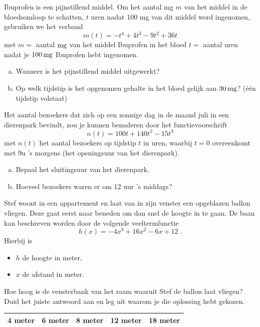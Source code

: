 \documentclass[12pt,twoside,a4paper]{article}
\begin{document}
\begin{oefening}
Ibuprofen is een pijnstillend middel.  Om het aantal mg $m$ van het middel in de bloedsomloop te schatten, $t$ uren nadat 100 mg van dit middel werd ingenomen, gebruiken we het verband
$$m(t)=-t^4+4t^3-9t^2+36t$$
met $m =$ aantal $\mg$ van het middel Ibuprofen in het bloed $t = $ aantal uren nadat je $100 \mg$ Ibuprofen hebt ingenomen.
\begin{enumerate}[(a)]
  \item Wanneer is het pijnstillend middel uitgewerkt?
  \item Op welk tijdstip is het opgenomen gehalte in het bloed gelijk aan $30 \mg$? (één tijdstip volstaat)
\end{enumerate}
\end{oefening}

\begin{oefening}
Het aantal bezoekers dat zich op een zonnige dag in de maand juli in een dierenpark bevindt, zou je kunnen benaderen door het functievoorschrift
$$n(t)=100t+140t^2-15t^3$$
met $n(t)$ het aantal bezoekers op tijdstip $t$ in uren, waarbij $t=0$ overeenkomt met 9u 's morgens (het openingsuur van het dierenpark).
\begin{enumerate}[(a)]
  \item Bepaal het sluitingsuur van het dierenpark.
  \item Hoeveel bezoekers waren er om 12 uur 's middags?
\end{enumerate}
\end{oefening}

\begin{oefening}
Stef woont in een appartement en laat van in zijn venster een opgeblazen ballon vliegen.  Deze gaat eerst naar beneden om dan snel de hoogte in te gaan.  De baan kan beschreven worden door de volgende veeltermfunctie
$$h(x)=-4x^3+16x^2-6x+12\;.$$
Hierbij is
\begin{itemize}
  \item $h$ de hoogte in meter,
  \item $x$ de afstand in meter.
\end{itemize}
Hoe hoog is de vensterbank van het raam waaruit Stef de ballon laat vliegen? Duid het juiste antwoord aan en leg uit waarom je die oplossing hebt gekozen.\\
\begin{center}
  \begin{tabular}{|ccccc|}
  \hline
  4 meter & 6 meter & 8 meter & 12 meter & 18 meter\\[0.2cm]
  \hline
  \end{tabular}
\end{center}
\end{oefening}
\end{document}
